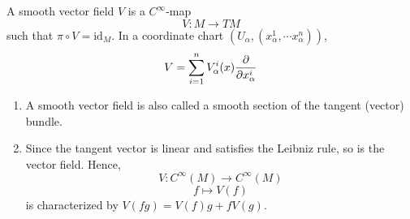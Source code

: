 \begin{definition}
            A smooth vector field \(V\) is a \(C^\infty\)-map
            \[
                V\colon M\to TM    
            \]
            such that \(\pi\circ V=\mathrm{id}_M\). In a coordinate
            chart \(\left(U_\alpha,\left(x^1_\alpha,\cdots
            x^n_\alpha
            \right)\right)\), \[
              V=\sum_{i=1}^n V^i_\alpha(x)\pdv{x^i_\alpha} 
            \]
\end{definition}
\begin{remark}
            \hfill
        \begin{enumerate}[(1)]
                \item A smooth vector field is also called a smooth
                section of the tangent (vector) bundle.
                \item Since the tangent vector is linear and satisfies
                the Leibniz rule, so is the vector field. Hence,
                \[
                    V\colon C^\infty(M)\to C^\infty(M)    
                \]
                \[
                    f\mapsto V(f)    
                \]
                is characterized by 
                \(V(fg)=V(f)g+fV(g)\).
        \end{enumerate}
\end{remark}
